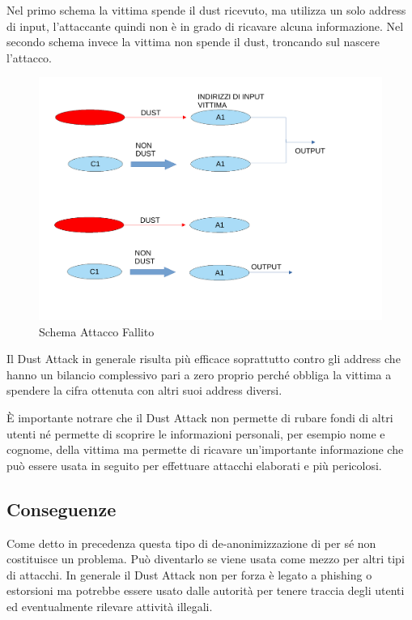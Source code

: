 Nel primo schema la vittima spende il dust ricevuto, ma utilizza un solo address di input, l'attaccante quindi non è in grado di ricavare alcuna informazione. Nel secondo schema invece la vittima non spende il dust, troncando sul nascere l'attacco. 
\begin{figure}[h!]
    \centering
    \includegraphics[scale=0.5]{Images/fallimento.pdf}
    \caption{Schema Attacco Fallito}
    \label{fig:fallito}
\end{figure}
\FloatBarrier
Il Dust Attack in generale risulta più efficace soprattutto contro gli address che hanno un bilancio complessivo pari a zero proprio perché obbliga la vittima a spendere la cifra ottenuta con altri suoi address diversi.



È importante notrare che il Dust Attack non permette di rubare fondi di altri utenti né permette di scoprire le informazioni personali, per esempio nome e cognome, della vittima ma permette di ricavare un'importante informazione che può essere usata in seguito per effettuare attacchi elaborati e più pericolosi.
\subsection{Conseguenze}\label{Conseguenze}
Come detto in precedenza questa tipo di de-anonimizzazione di per sé non costituisce un problema. Può diventarlo se viene usata come mezzo per altri tipi di attacchi. In generale il Dust Attack non per forza è legato a phishing o estorsioni ma potrebbe essere usato dalle autorità per tenere traccia degli utenti ed eventualmente rilevare attività illegali.

